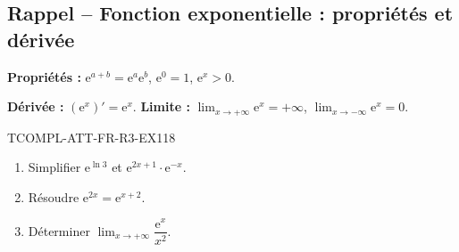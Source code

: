 

\subsection*{Rappel -- Fonction exponentielle : propriétés et dérivée}

\textbf{Propriétés :} $\mathrm{e}^{a+b} = \mathrm{e}^a \mathrm{e}^b$, $\mathrm{e}^0 = 1$, $\mathrm{e}^x > 0$.

\textbf{Dérivée :} $(\mathrm{e}^x)' = \mathrm{e}^x$. \textbf{Limite :} $\lim_{x \to +\infty} \mathrm{e}^x = +\infty$, $\lim_{x \to -\infty} \mathrm{e}^x = 0$.

\begin{exercice}{TCOMPL-ATT-FR-R3-EX1}{1}{8}
\begin{enumerate}
  \item Simplifier $\mathrm{e}^{\ln 3}$ et $\mathrm{e}^{2x + 1} \cdot \mathrm{e}^{-x}$.
  \item Résoudre $\mathrm{e}^{2x} = \mathrm{e}^{x+2}$.
  \item Déterminer $\lim_{x \to +\infty} \dfrac{\mathrm{e}^x}{x^2}$.
\end{enumerate}
\end{exercice}

